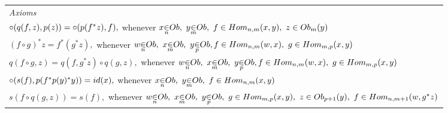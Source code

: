 \documentclass[10pt,a4paper]{article}
\begin{document}
\begin{tabular}{l}
\itshape{Axioms} \\
$\circ(q(f,z),p(z))=\circ(p(f^* z),f),$ 
          whenever $\ofObi{x}{n} ,\  \ofObi{y}{m} ,\  \ofHomij{f}{n}{m}{x}{y} ,\  \ofT{z}{\Obi{m}(y)} $\\  [0.25cm]
					

$(f \circ g)^*z =  f^* (g ^* z), $
          whenever  $ \ofObi{w}{n} ,\ \ofObi{x}{m} ,\ \ofObi{y}{p}, 
					\ofHomij{f}{n}{m}{w}{x} ,\  \ofHomij{g}{m}{p}{x}{y}    $ \\[0.25cm]

$q(f \circ g,z) = q(f,g^*z) \circ q(g,z), $
				   whenever  $ \ofObi{w}{n} ,\ \ofObi{x}{m} ,\ \ofObi{y}{p}, 
					\ofHomij{f}{n}{m}{w}{x} ,\  \ofHomij{g}{m}{p}{x}{y}    $ \\[0.25cm]
					
$\circ(s(f),p(f ^* p(y) ^* y)) = id(x),$ 
          whenever $\ofObi{x}{n} ,\  \ofObi{y}{m} ,\  \ofHomij{f}{n}{m}{x}{y} $ \\ [0.25cm]
					
					
	$s(f \circ q(g,z))=s(f),$ 
          whenever $\ofObi{w}{n} ,\  \ofObi{x}{m}  ,\   \ofObi{y}{p} ,\    \ofHomij{g}{m}{p}{x}{y} ,\ \ofT{z}{\Obi{p+1}(y)} ,\ \ofHomij{f}{n}{m+1}{w}{g \sub z} $ \\ [0.25cm]				
					
\end{tabular}  \\
\vspace{.1cm}  \\
\vspace{.03cm} \\


 
\end{document}
